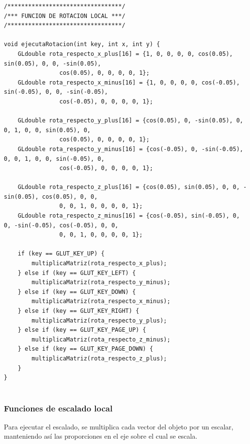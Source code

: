 \documentclass[12pt,a4paper]{article}
\begin{document}
\begin{lstlisting}
/*********************************/
/*** FUNCION DE ROTACION LOCAL ***/
/*********************************/

void ejecutaRotacion(int key, int x, int y) {
    GLdouble rota_respecto_x_plus[16] = {1, 0, 0, 0, 0, cos(0.05), sin(0.05), 0, 0, -sin(0.05), 
    			cos(0.05), 0, 0, 0, 0, 1};
    GLdouble rota_respecto_x_minus[16] = {1, 0, 0, 0, 0, cos(-0.05), sin(-0.05), 0, 0, -sin(-0.05), 
    			cos(-0.05), 0, 0, 0, 0, 1};

    GLdouble rota_respecto_y_plus[16] = {cos(0.05), 0, -sin(0.05), 0, 0, 1, 0, 0, sin(0.05), 0, 
    			cos(0.05), 0, 0, 0, 0, 1};
    GLdouble rota_respecto_y_minus[16] = {cos(-0.05), 0, -sin(-0.05), 0, 0, 1, 0, 0, sin(-0.05), 0, 
    			cos(-0.05), 0, 0, 0, 0, 1};

    GLdouble rota_respecto_z_plus[16] = {cos(0.05), sin(0.05), 0, 0, -sin(0.05), cos(0.05), 0, 0, 
    			0, 0, 1, 0, 0, 0, 0, 1};
    GLdouble rota_respecto_z_minus[16] = {cos(-0.05), sin(-0.05), 0, 0, -sin(-0.05), cos(-0.05), 0, 0, 
    			0, 0, 1, 0, 0, 0, 0, 1};

    if (key == GLUT_KEY_UP) {
        multiplicaMatriz(rota_respecto_x_plus);
    } else if (key == GLUT_KEY_LEFT) {
        multiplicaMatriz(rota_respecto_y_minus);
    } else if (key == GLUT_KEY_DOWN) {
        multiplicaMatriz(rota_respecto_x_minus);
    } else if (key == GLUT_KEY_RIGHT) {
        multiplicaMatriz(rota_respecto_y_plus);
    } else if (key == GLUT_KEY_PAGE_UP) {
        multiplicaMatriz(rota_respecto_z_minus);
    } else if (key == GLUT_KEY_PAGE_DOWN) {
        multiplicaMatriz(rota_respecto_z_plus);
    }
}


\end{lstlisting}

\subsubsection{Funciones de escalado local}

Para ejecutar el escalado,  se multiplica cada vector del objeto por un escalar, manteniendo así las proporciones en el eje sobre el cual se escala.
\end{document}

